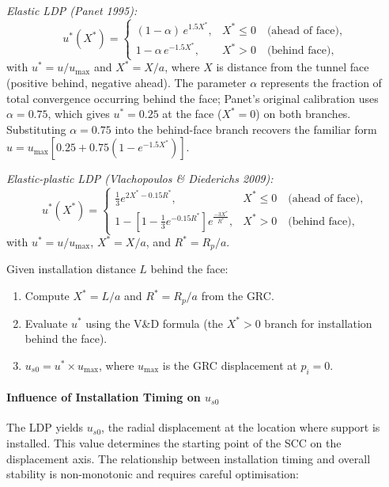 \textit{Elastic LDP (Panet 1995):}
\[
u^*(X^*) =
\begin{cases}
(1 - \alpha)\,e^{1.5X^*}, & X^* \leq 0 \quad \text{(ahead of face)},\\[4pt]
1 - \alpha\,e^{-1.5X^*}, & X^* > 0 \quad \text{(behind face)},
\end{cases}
\]
with $u^* = u/u_{\max}$ and $X^* = X/a$, where $X$ is distance from the tunnel face (positive behind, negative ahead). The parameter $\alpha$ represents the fraction of total convergence occurring behind the face; Panet's original calibration uses $\alpha = 0.75$, which gives $u^* = 0.25$ at the face ($X^* = 0$) on both branches. Substituting $\alpha = 0.75$ into the behind-face branch recovers the familiar form $u = u_{\max}[0.25 + 0.75(1 - e^{-1.5X^*})]$.

\textit{Elastic-plastic LDP (Vlachopoulos \& Diederichs 2009):}
\[
u^*(X^*) =
\begin{cases}
\frac{1}{3} e^{2X^* - 0.15R^*}, & X^* \leq 0 \quad \text{(ahead of face)},\\[4pt]
1 - \left[1 - \frac{1}{3} e^{-0.15R^*}\right] e^{\frac{-3X^*}{R^*}}, & X^* > 0 \quad \text{(behind face)},
\end{cases}
\]
with $u^* = u/u_{\max}$, $X^* = X/a$, and $R^* = R_p/a$.

\begin{notebox}
Given installation distance $L$ behind the face:
\begin{enumerate}[nosep]
\item Compute $X^* = L/a$ and $R^* = R_p/a$ from the GRC.
\item Evaluate $u^*$ using the V\&D formula (the $X^*>0$ branch for installation behind the face).
\item $u_{s0} = u^* \times u_{\max}$, where $u_{\max}$ is the GRC displacement at $p_i = 0$.
\end{enumerate}
\end{notebox}

\paragraph{Influence of Installation Timing on $u_{s0}$}
The LDP yields $u_{s0}$, the radial displacement at the location where support is installed. This value determines the starting point of the SCC on the displacement axis. The relationship between installation timing and overall stability is non-monotonic and requires careful optimisation:

